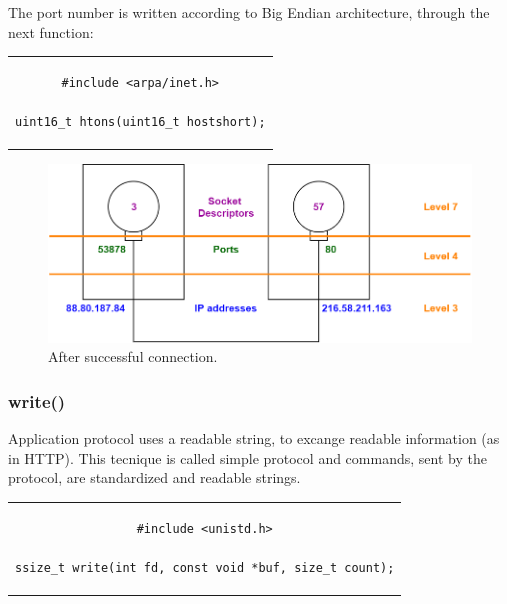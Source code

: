 The port number is written according to Big Endian architecture, through the next function:
\begin{center}
\begin{tabular}{c}
\begin{lstlisting}[linewidth=200pt, basicstyle=\footnotesize\sffamily,]
#include <arpa/inet.h>

uint16_t htons(uint16_t hostshort);
\end{lstlisting}
\end{tabular}
\end{center}
\begin{figure}[h]
\centering
\includegraphics[scale=0.4]{Images/NetworkC/addresses}\caption{\footnotesize{After successful connection.}}\label{addresses}
\end{figure}

\subsubsection{write()}
Application protocol uses a readable string, to excange readable information (as in HTTP). This tecnique is called simple protocol and commands, sent by the protocol, are standardized and readable strings.  

\begin{center}
\begin{tabular}{c}
\begin{lstlisting}[linewidth=280pt, basicstyle=\footnotesize\sffamily,]
#include <unistd.h>

ssize_t write(int fd, const void *buf, size_t count);
\end{lstlisting}
\end{tabular}
\end{center}

